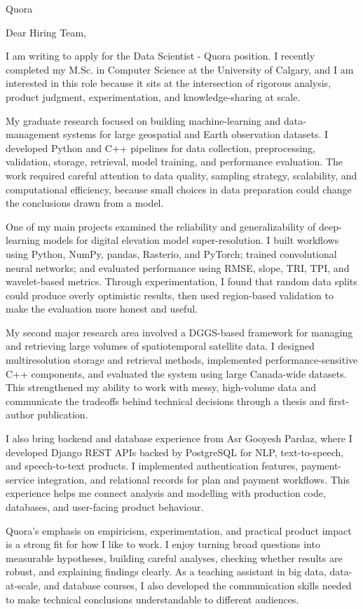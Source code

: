 \documentclass[11pt]{letter}
\begin{document}
\begin{letter}{Quora}

\opening{Dear Hiring Team,}

I am writing to apply for the Data Scientist - Quora position. I recently completed my M.Sc. in Computer Science at the University of Calgary, and I am interested in this role because it sits at the intersection of rigorous analysis, product judgment, experimentation, and knowledge-sharing at scale.

My graduate research focused on building machine-learning and data-management systems for large geospatial and Earth observation datasets. I developed Python and C++ pipelines for data collection, preprocessing, validation, storage, retrieval, model training, and performance evaluation. The work required careful attention to data quality, sampling strategy, scalability, and computational efficiency, because small choices in data preparation could change the conclusions drawn from a model.

One of my main projects examined the reliability and generalizability of deep-learning models for digital elevation model super-resolution. I built workflows using Python, NumPy, pandas, Rasterio, and PyTorch; trained convolutional neural networks; and evaluated performance using RMSE, slope, TRI, TPI, and wavelet-based metrics. Through experimentation, I found that random data splits could produce overly optimistic results, then used region-based validation to make the evaluation more honest and useful.

My second major research area involved a DGGS-based framework for managing and retrieving large volumes of spatiotemporal satellite data. I designed multiresolution storage and retrieval methods, implemented performance-sensitive C++ components, and evaluated the system using large Canada-wide datasets. This strengthened my ability to work with messy, high-volume data and communicate the tradeoffs behind technical decisions through a thesis and first-author publication.

I also bring backend and database experience from Asr Gooyesh Pardaz, where I developed Django REST APIs backed by PostgreSQL for NLP, text-to-speech, and speech-to-text products. I implemented authentication features, payment-service integration, and relational records for plan and payment workflows. This experience helps me connect analysis and modelling with production code, databases, and user-facing product behaviour.

Quora's emphasis on empiricism, experimentation, and practical product impact is a strong fit for how I like to work. I enjoy turning broad questions into measurable hypotheses, building careful analyses, checking whether results are robust, and explaining findings clearly. As a teaching assistant in big data, data-at-scale, and database courses, I also developed the communication skills needed to make technical conclusions understandable to different audiences.


\end{letter}
\end{document}
